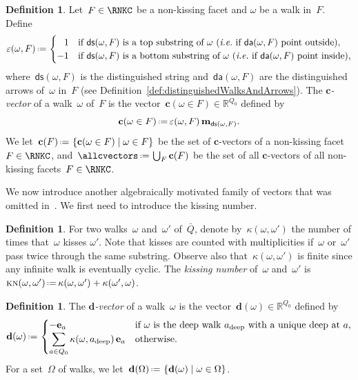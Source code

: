 \documentclass{amsart}
\theoremstyle{definition}
\newtheorem{definition}[theorem]{Definition}
\newcommand{\R}{\mathbb{R}} %
\renewcommand{\b}[1]{\mathbf{#1}} %
\newcommand{\set}[2]{\left\{ #1 \;\middle|\; #2 \right\}} %
\newcommand{\eqdef}{\mbox{\,\raisebox{0.2ex}{\scriptsize\ensuremath{\mathrm:}}\ensuremath{=}\,}} %
\newcommand{\ie}{\textit{i.e.}~} %
\newcommand{\darkblue}{\color{darkblue}} %
\newcommand{\defn}[1]{\textsl{\darkblue #1}} %
\newcommand{\distinguishedArrows}[2]{\mathsf{da}(#1,#2)} %
\newcommand{\distinguishedString}[2]{\mathsf{ds}(#1,#2)} %
\newcommand{\distinguishedSign}[2]{\varepsilon(#1,#2)} %
\newcommand{\kn}{\kappa} %
\newcommand{\KN}{\textsc{kn}} %
\newcommand{\deep}{\mathrm{deep}} %
\newcommand{\dvector}[1]{\mathbf{d}(#1)} %
\newcommand{\dvectors}[1]{\mathbf{d}(#1)} %
\newcommand{\cvector}[2]{\mathbf{c}(#1 \in #2)} %
\newcommand{\cvectors}[1]{\mathbf{c}(#1)} %
\newcommand{\multiplicityVector}{\b{m}} %
\begin{document}
\begin{definition}
\label{def:cVectorsWalks}
Let~$F \in \RNKC$ be a non-kissing facet and $\omega$ be a walk in~$F$.
Define
\[
\distinguishedSign{\omega}{F} \eqdef 
\begin{cases}
\phantom{-}1 & \text{if~$\distinguishedString{\omega}{F}$ is a top substring of~$\omega$ (\ie if~$\distinguishedArrows{\omega}{F}$ point outside),} \\
-1 & \text{if~$\distinguishedString{\omega}{F}$ is a bottom substring of~$\omega$ (\ie if~$\distinguishedArrows{\omega}{F}$ point inside),}
\end{cases}
\]
where~$\distinguishedString{\omega}{F}$ is the distinguished string and~$\distinguishedArrows{\omega}{F}$ are the distinguished arrows of~$\omega$ in~$F$ (see Definition~\ref{def:distinguishedWalksAndArrows}).
The \defn{$\b{c}$-vector} of a walk~$\omega$ of~$F$ is the vector~${\cvector{\omega}{F} \in \R^{Q_0}}$ defined by
\[
\cvector{\omega}{F} \eqdef \distinguishedSign{\omega}{F} \, \multiplicityVector_{\distinguishedString{\omega}{F}}.
\]
We let~$\cvectors{F} \eqdef \set{\cvector{\omega}{F}}{\omega \in F}$ be the set of $\b{c}$-vectors of a non-kissing facet~$F \in \RNKC$, and~$\allcvectors \eqdef \bigcup_F \cvectors{F}$ be the set of all $\b{c}$-vectors of all non-kissing facets~${F \in \RNKC}$.
\end{definition}

We now introduce another algebraically motivated family of vectors that was omitted in~\cite{PaluPilaudPlamondon}.
We first need to introduce the kissing number.

\begin{definition}
\label{def:kissingNumber}
For two walks~$\omega$ and~$\omega'$ of~$\bar Q$, denote by~$\kn(\omega,\omega')$ the number of times that~$\omega$ kisses $\omega'$.
Note that kisses are counted with multiplicities if~$\omega$ or~$\omega'$ pass twice through the same substring.
Observe also that~$\kn(\omega,\omega')$ is finite since any infinite walk is eventually cyclic.
The \defn{kissing number} of~$\omega$ and~$\omega'$ is~$\KN(\omega,\omega') \eqdef \kn(\omega,\omega') + \kn(\omega',\omega)$.
\end{definition}

\begin{definition}
\label{def:dVectorsWalks}
The \defn{$\b{d}$-vector} of a walk~$\omega$ is the vector~$\dvector{\omega} \in \R^{Q_0}$ defined by
\[
\dvector{\omega} \eqdef 
\begin{cases}
- \b{e}_a & \text{if $\omega$ is the deep walk~$a_\deep$ with a unique deep at~$a$,} \\
\displaystyle \sum_{a \in Q_0} \kn(\omega, a_\deep) \, \b{e}_a & \text{otherwise.}
\end{cases}
\]
For a set~$\Omega$ of walks, we let~$\dvectors{\Omega} \eqdef \set{\dvector{\omega}}{\omega \in \Omega}$.
\end{definition}
\end{document}
